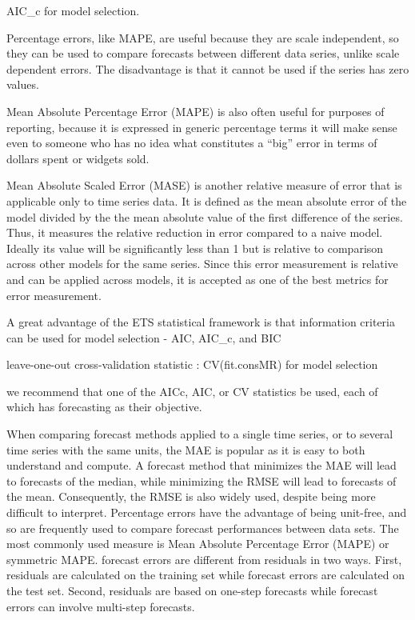 \documentclass[]{book}
\begin{document}
AIC\_c for model selection.

Percentage errors, like MAPE, are useful because they are scale independent, so they can be used to compare forecasts between different data series, unlike scale dependent errors. The disadvantage is that it cannot be used if the series has zero values.

Mean Absolute Percentage Error (MAPE) is also often useful for purposes of reporting, because it is expressed in generic percentage terms it will make sense even to someone who has no idea what constitutes a ``big'' error in terms of dollars spent or widgets sold.

Mean Absolute Scaled Error (MASE) is another relative measure of error that is applicable only to time series data. It is defined as the mean absolute error of the model divided by the the mean absolute value of the first difference of the series. Thus, it measures the relative reduction in error compared to a naive model. Ideally its value will be significantly less than 1 but is relative to comparison across other models for the same series. Since this error measurement is relative and can be applied across models, it is accepted as one of the best metrics for error measurement.

A great advantage of the ETS statistical framework is that information criteria can be used for model selection - AIC, AIC\_c, and BIC

leave-one-out cross-validation statistic : CV(fit.consMR) for model selection

we recommend that one of the AICc, AIC, or CV statistics be used, each of which has forecasting as their objective.

When comparing forecast methods applied to a single time series, or to several time series with the same units, the MAE is popular as it is easy to both understand and compute. A forecast method that minimizes the MAE will lead to forecasts of the median, while minimizing the RMSE will lead to forecasts of the mean. Consequently, the RMSE is also widely used, despite being more difficult to interpret. Percentage errors have the advantage of being unit-free, and so are frequently used to compare forecast performances between data sets. The most commonly used measure is Mean Absolute Percentage Error (MAPE) or symmetric MAPE. forecast errors are different from residuals in two ways. First, residuals are calculated on the training set while forecast errors are calculated on the test set. Second, residuals are based on one-step forecasts while forecast errors can involve multi-step forecasts.
\end{document}
